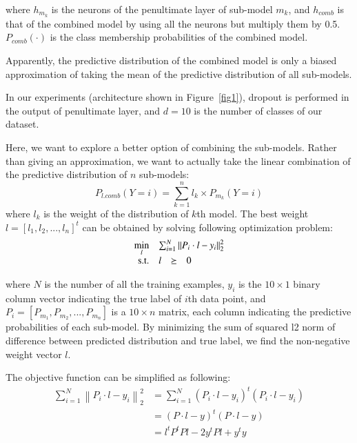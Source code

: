 \documentclass{article} %
\begin{document}
where $h_{m_{k}}$ is the neurons of the penultimate layer of sub-model $m_{k}$, and $h_{comb}$ is  that of the combined model by using all the neurons but multiply them by 0.5. $P_{comb}(\cdot)$ is the class membership probabilities of the combined model. 
\par
Apparently, the predictive distribution of the combined model is only a biased approximation of taking the mean of the predictive distribution of all sub-models.
\par
In our experiments (architecture shown in Figure~\ref{fig1}), dropout is performed in the output of penultimate layer, and $d=10$ is the number of classes of our dataset.
\par
Here, we want to explore a better option of combining the sub-models. Rather than giving an approximation, we want to actually take the linear combination of the predictive distribution of $n$ sub-models:
\begin{equation}
P_{l.comb}(Y=i) = \sum_{k=1}^{n}l_{k}\times P_{m_{k}}(Y=i)
\end{equation}
where $l_{k}$ is the weight of the distribution of $k$th model. The best weight $l=\left[ l_{1},l_{2}, ..., l_{n}\right]^{t}$ can be obtained by solving following optimization problem:
\begin{equation}
\begin{array}{rrclcl}
\displaystyle \min_{l} & \multicolumn{3}{l}{\sum_{i=1}^{N}\left \| P_{i}\cdot l-y_{i} \right \|_{2}^{2}}\\
\textrm{s.t.} & l& \succeq & 0\\
\end{array}
\end{equation}
\par
where $N$ is the number of all the training examples, $y_{i}$ is the $10 \times 1$ binary column vector indicating the true label of $i$th data point, and $P_{i} =\left [ P_{m_{1}},P_{m_{2}},...,P_{m_{n}} \right ] $ is a $10 \times n$ matrix, each column indicating the predictive probabilities of each sub-model. By minimizing the sum of squared l2 norm of difference between predicted distribution and true label, we find the non-negative weight vector $l$.
\par
The objective function can be simplified as following:
\begin{equation}
\begin{split}
\sum_{i=1}^{N}\left \| P_{i}\cdot l-y_{i} \right \|_{2}^{2} &=\sum_{i=1}^{N}(P_{i}\cdot l-y_{i})^{t}(P_{i}\cdot l-y_{i})
 \\
&=(P\cdot l-y)^{t}(P\cdot l-y)
 \\
&=l^{t}P^{t}Pl-2y^{t}Pl+y^{t}y
\end{split}
\end{equation}
\end{document}
